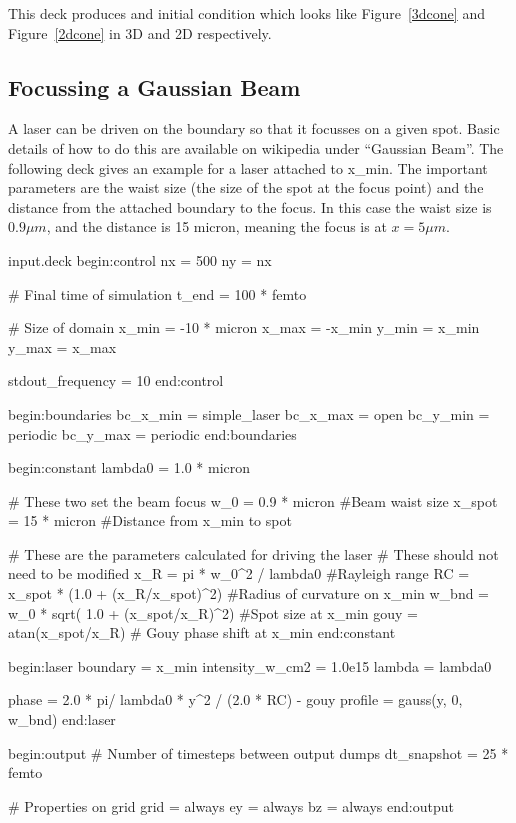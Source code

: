 
This deck produces and initial condition which looks like Figure~\ref{3dcone}
and Figure~\ref{2dcone} in 3D and 2D respectively.

\subsection{Focussing a Gaussian Beam}\label{sec:focus_eg}
A laser can be driven on the boundary so that it focusses on a given spot.
Basic details of how to do this are available on wikipedia under
``Gaussian Beam''. The following deck gives an example for a laser attached
to x\_min. The important parameters are the waist size (the size of the spot
at the focus point) and the distance from the attached boundary to the focus.
In this case the waist size is $0.9\mu m$, and the distance is 15 micron,
meaning the focus is at $x = 5\mu m$.

\begin{lboxverbatim}{input.deck}
begin:control
  nx = 500
  ny = nx

  # Final time of simulation
  t_end = 100 * femto

  # Size of domain
  x_min = -10 * micron
  x_max = -x_min
  y_min = x_min
  y_max = x_max

  stdout_frequency = 10
end:control

begin:boundaries
  bc_x_min = simple_laser
  bc_x_max = open
  bc_y_min = periodic
  bc_y_max = periodic
end:boundaries

begin:constant
  lambda0 = 1.0 * micron

  # These two set the beam focus
  w_0 = 0.9 * micron #Beam waist size
  x_spot = 15 * micron #Distance from x_min to spot

  # These are the parameters calculated for driving the laser
  # These should not need to be modified
  x_R = pi * w_0^2 / lambda0 #Rayleigh range
  RC = x_spot * (1.0 + (x_R/x_spot)^2) #Radius of curvature on x_min
  w_bnd = w_0 * sqrt( 1.0 + (x_spot/x_R)^2) #Spot size at x_min
  gouy = atan(x_spot/x_R) # Gouy phase shift at x_min
end:constant

begin:laser
  boundary = x_min
  intensity_w_cm2 = 1.0e15
  lambda = lambda0

  phase = 2.0 * pi/ lambda0 * y^2 / (2.0 * RC) - gouy
  profile = gauss(y, 0, w_bnd)
end:laser

begin:output
  # Number of timesteps between output dumps
  dt_snapshot = 25 * femto

  # Properties on grid
  grid = always
  ey = always
  bz = always
end:output
\end{lboxverbatim}

